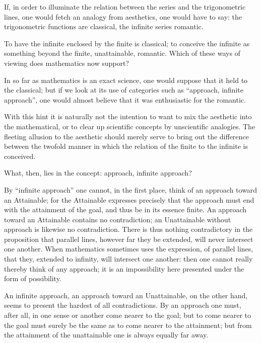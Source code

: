 \documentclass[12pt]{book}
\begin{document}
If, in order to illuminate the relation between the series and the trigonometric
lines, one would fetch an analogy from aesthetics, one would have to say: the
trigonometric functions are classical, the infinite series romantic.

To have the infinite enclosed by the finite is classical; to conceive the infinite
as something beyond the finite, unattainable, romantic. Which of these ways of
viewing does mathematics now support?

In so far as mathematics is an exact science, one would suppose that it held to the
classical; but if we look at its use of categories such as ``approach, infinite
approach'', one would almost believe that it was enthusiastic for the romantic.

With this hint it is naturally not the intention to want to mix the aesthetic into
the mathematical, or to clear up scientific concepts by unscientific analogies. The
fleeting allusion to the aesthetic should merely serve to bring out the difference
between the twofold
manner in which the relation of the finite to the infinite is conceived.

What, then, lies in the concept: approach, infinite approach?

By ``infinite approach'' one cannot, in the first place, think of an approach toward
an Attainable; for the Attainable expresses precisely that the approach must end
with the attainment of the goal, and thus be in its essence finite. An approach
toward an Attainable contains no contradiction; an Unattainable without approach is
likewise
no contradiction. There is thus nothing contradictory in the proposition that
parallel lines, however far they be extended, will never intersect one another.
When mathematics sometimes uses the expression, of parallel lines, that they,
extended to infinity, will intersect one another: then one cannot really thereby
think of any approach; it is an impossibility here presented under the form of
possibility.

An infinite approach, an approach toward an Unattainable, on the other hand, seems
to present the hardest of all contradictions. By an approach one must, after all,
in one sense or another come nearer to the goal; but to come nearer to the goal
must surely be the same as to come nearer to the attainment; but from the
attainment of the unattainable one is always equally far away.
\end{document}
